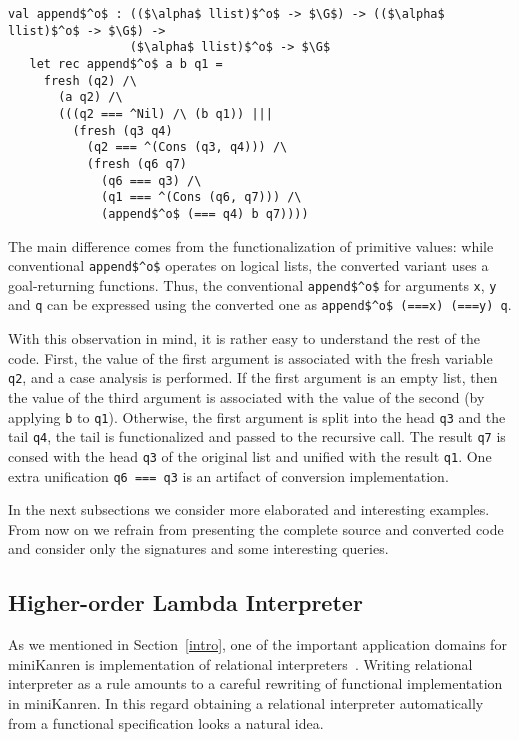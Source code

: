 \begin{lstlisting}[basicstyle=\small]
   val append$^o$ : (($\alpha$ llist)$^o$ -> $\G$) -> (($\alpha$ llist)$^o$ -> $\G$) -> 
                 ($\alpha$ llist)$^o$ -> $\G$
   let rec append$^o$ a b q1 =
     fresh (q2) /\
       (a q2) /\
       (((q2 === ^Nil) /\ (b q1)) |||
         (fresh (q3 q4)
           (q2 === ^(Cons (q3, q4))) /\
           (fresh (q6 q7)
             (q6 === q3) /\             
             (q1 === ^(Cons (q6, q7))) /\
             (append$^o$ (=== q4) b q7))))
\end{lstlisting}

The main difference comes from the functionalization of primitive values: while conventional \lstinline|append$^o$| operates
on logical lists, the converted variant uses a goal-returning functions. Thus, the conventional \lstinline{append$^o$} for arguments
\lstinline|x|, \lstinline|y| and \lstinline|q| can be expressed using the converted one as \lstinline{append$^o$ (===x) (===y) q}.

With this observation in mind, it is rather easy to understand the rest of the code. First, the value of the first argument is
associated with the fresh variable \lstinline|q2|, and a case analysis is performed. If the first argument is an empty list, then the 
value of the third argument is associated with the value of the second (by applying \lstinline|b| to \lstinline|q1|). Otherwise, the first
argument is split into the head \lstinline|q3| and the tail \lstinline|q4|, the tail is functionalized and passed to the recursive
call. The result \lstinline|q7| is consed with the head \lstinline|q3| of the original list and unified with the result \lstinline|q1|. One extra
unification \lstinline|q6 === q3| is an artifact of conversion implementation.

In the next subsections we consider more elaborated and interesting examples. From now on we refrain from presenting the complete source and
converted code and consider only the signatures and some interesting queries. 

\subsection{Higher-order Lambda Interpreter}

As we mentioned in Section~\ref{intro}, one of the important application domains for miniKanren is implementation of relational interpreters~\cite{WillThesis,unified,Untagged}. 
Writing relational interpreter as a rule amounts to a careful rewriting of functional implementation in miniKanren. In this regard obtaining a relational
interpreter automatically from a functional specification looks a natural idea.


